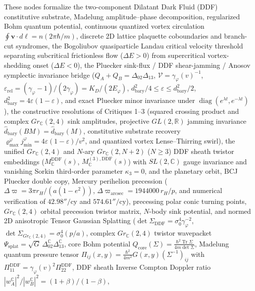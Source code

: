 These nodes formalize the two-component Dilatant Dark Fluid (DDF) constitutive
substrate, Madelung amplitude--phase decomposition, regularized Bohm quantum
potential, continuous quantized vortex circulation
$\oint \mathbf v\cdot d\boldsymbol\ell = n(2\pi\hbar/m)$, discrete 2D lattice
plaquette coboundaries and branch-cut syndromes, the Bogoliubov quasiparticle
Landau critical velocity threshold separating subcritical frictionless flow
($\Delta E>0$) from supercritical vortex-shedding onset ($\Delta E<0$), the
Pluecker sink-flux / DDF shear-jamming / Anosov symplectic invariance bridge
($Q_A+Q_B=\Delta_{02}\Delta_{13}$, $\mathcal{V}=\gamma_\varphi(v)^{-1}$,
$\varepsilon_{\mathrm{rel}}=(\gamma_\varphi-1)/(2\gamma_\varphi)=K_D/(2E_\varphi)$,
$d_{\mathrm{bary}}^2/4\le\varepsilon\le d_{\mathrm{bary}}^2/2$,
$d_{\mathrm{bary}}^2=4\varepsilon(1-\varepsilon)$, and exact Pluecker minor
invariance under $\operatorname{diag}(e^{\lambda t},e^{-\lambda t})$),
the constructive resolutions of Critiques 1--3 (squared crossing product and
complex $Gr_{\mathbb C}(2,4)$ sink amplitudes, projective $GL(2,\mathbb R)$
jamming invariance $\widehat{d}_{\mathrm{bary}}(BM)=\widehat{d}_{\mathrm{bary}}(M)$,
constitutive substrate recovery $\varrho_{\max}^\varphi j_{\min}^\varphi=4\varepsilon(1-\varepsilon)/v^2$,
and quantized vortex Lense--Thirring swirl), the unified
$Gr_{\mathbb C}(2,4)$ and $N$-ary $Gr_{\mathbb C}(2,N+2)$ ($N\ge 3$) DDF sheath
twistor embeddings ($M_{\mathbb C}^{\mathrm{DDF}}(s)$,
$M_{\mathbb C}^{(3),\mathrm{DDF}}(s)$) with $SL(2,\mathbb C)$ gauge invariance
and vanishing Sorkin third-order parameter $\kappa_3=0$, and the planetary
orbit, BCJ Pluecker double copy, Mercury perihelion precession
($\Delta\varpi=3\pi r_H/(a(1-e^2))$, $\Delta\varpi_{\mathrm{arcsec}}=1944000\,r_H/p$,
and numerical verification of $42.98''/\text{cy}$ and $574.61''/\text{cy}$),
precessing polar conic turning points, $Gr_{\mathbb C}(2,4)$ orbital precession
twistor matrix, $N$-body sink potential, and normed 2D anisotropic Tensor
Gaussian Splatting ($\det\Sigma_{\mathrm{DDF}}=\sigma_0^4\gamma_\varphi^{-2}$,
$\det\Sigma_{Gr_{\mathbb C}(2,4)}=\sigma_0^4(p/a)$, complex $Gr_{\mathbb C}(2,4)$
twistor wavepacket $\Psi_{\mathrm{splat}}=\sqrt{G}\,\Delta_{02}^{\mathbb C}\Delta_{13}^{\mathbb C}$,
core Bohm potential $Q_{\mathrm{core}}(\Sigma)=\frac{\hbar^2\operatorname{Tr}\Sigma}{4m\det\Sigma}$,
Madelung quantum pressure tensor $\Pi_{ij}(x,y)=\frac{\hbar^2}{4m^2}G(x,y)(\Sigma^{-1})_{ij}$
with $\Pi_{11}^{\mathrm{DDF}}=\gamma_\varphi(v)^2\Pi_{22}^{\mathrm{DDF}}$,
DDF sheath Inverse Compton Doppler ratio $|w_A^{\mathbb C}|^2/|w_B^{\mathbb C}|^2=(1+\beta)/(1-\beta)$,
